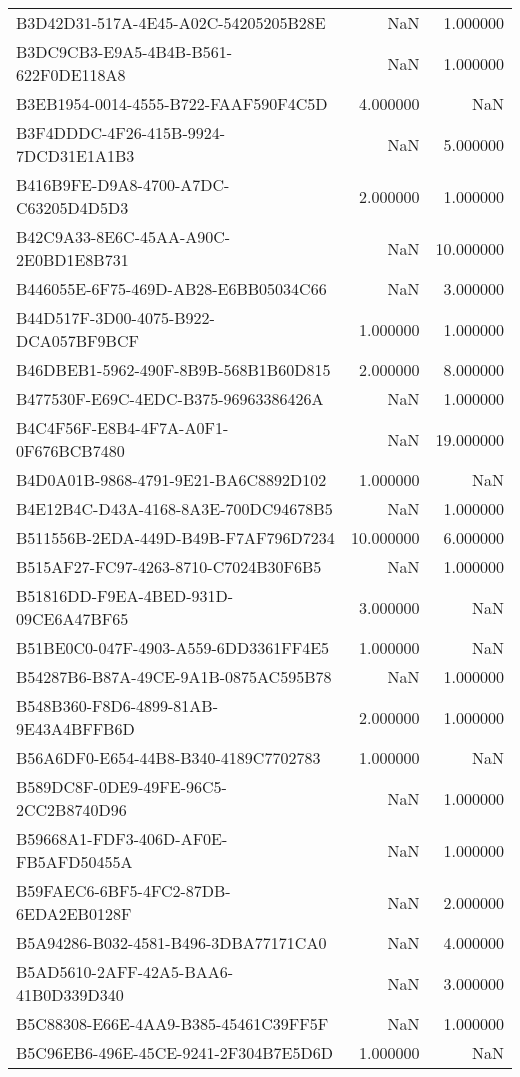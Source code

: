 \begin{tabular}{lrr}
B3D42D31-517A-4E45-A02C-54205205B28E & NaN & 1.000000 \\
B3DC9CB3-E9A5-4B4B-B561-622F0DE118A8 & NaN & 1.000000 \\
B3EB1954-0014-4555-B722-FAAF590F4C5D & 4.000000 & NaN \\
B3F4DDDC-4F26-415B-9924-7DCD31E1A1B3 & NaN & 5.000000 \\
B416B9FE-D9A8-4700-A7DC-C63205D4D5D3 & 2.000000 & 1.000000 \\
B42C9A33-8E6C-45AA-A90C-2E0BD1E8B731 & NaN & 10.000000 \\
B446055E-6F75-469D-AB28-E6BB05034C66 & NaN & 3.000000 \\
B44D517F-3D00-4075-B922-DCA057BF9BCF & 1.000000 & 1.000000 \\
B46DBEB1-5962-490F-8B9B-568B1B60D815 & 2.000000 & 8.000000 \\
B477530F-E69C-4EDC-B375-96963386426A & NaN & 1.000000 \\
B4C4F56F-E8B4-4F7A-A0F1-0F676BCB7480 & NaN & 19.000000 \\
B4D0A01B-9868-4791-9E21-BA6C8892D102 & 1.000000 & NaN \\
B4E12B4C-D43A-4168-8A3E-700DC94678B5 & NaN & 1.000000 \\
B511556B-2EDA-449D-B49B-F7AF796D7234 & 10.000000 & 6.000000 \\
B515AF27-FC97-4263-8710-C7024B30F6B5 & NaN & 1.000000 \\
B51816DD-F9EA-4BED-931D-09CE6A47BF65 & 3.000000 & NaN \\
B51BE0C0-047F-4903-A559-6DD3361FF4E5 & 1.000000 & NaN \\
B54287B6-B87A-49CE-9A1B-0875AC595B78 & NaN & 1.000000 \\
B548B360-F8D6-4899-81AB-9E43A4BFFB6D & 2.000000 & 1.000000 \\
B56A6DF0-E654-44B8-B340-4189C7702783 & 1.000000 & NaN \\
B589DC8F-0DE9-49FE-96C5-2CC2B8740D96 & NaN & 1.000000 \\
B59668A1-FDF3-406D-AF0E-FB5AFD50455A & NaN & 1.000000 \\
B59FAEC6-6BF5-4FC2-87DB-6EDA2EB0128F & NaN & 2.000000 \\
B5A94286-B032-4581-B496-3DBA77171CA0 & NaN & 4.000000 \\
B5AD5610-2AFF-42A5-BAA6-41B0D339D340 & NaN & 3.000000 \\
B5C88308-E66E-4AA9-B385-45461C39FF5F & NaN & 1.000000 \\
B5C96EB6-496E-45CE-9241-2F304B7E5D6D & 1.000000 & NaN \\

\end{tabular}
